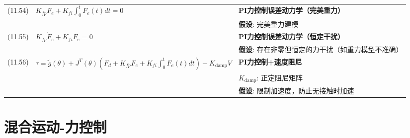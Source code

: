 \documentclass[12pt,a4paper]{article}
\begin{document}
\begin{longtable}{|p{}|p{}|p{}|}
(11.54) & $K_{fp}F_e + K_{fi}\int_0^t F_e(t)dt = 0$ & 
\textbf{PI力控制误差动力学（完美重力）} \\
& & \textbf{假设}: 完美重力建模 \\
\hline

(11.55) & $K_{fp}\dot{F}_e + K_{fi}F_e = 0$ & 
\textbf{PI力控制误差动力学（恒定干扰）} \\
& & \textbf{假设}: 存在非零但恒定的力干扰（如重力模型不准确） \\
\hline

(11.56) & $\tau = \tilde{g}(\theta) + J^T(\theta)\left(F_d + K_{fp}F_e + K_{fi}\int_0^t F_e(t)dt\right) - K_{\text{damp}}V$ & 
\textbf{PI力控制+速度阻尼} \\
& & $K_{\text{damp}}$: 正定阻尼矩阵 \\
& & \textbf{假设}: 限制加速度，防止无接触时加速 \\
\hline

\end{longtable}

\section{混合运动-力控制}
\end{document}

